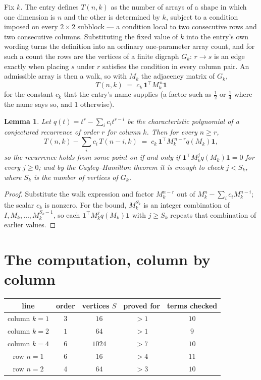 \documentclass[11pt,a4paper]{article}
\theoremstyle{plain}
\newtheorem{lemma}[theorem]{Lemma}
\theoremstyle{definition}
\begin{document}
Fix $k$. The entry defines $T(n,k)$ as the number of arrays of a shape in which one dimension
is $n$ and the other is determined by $k$, subject to a condition imposed on every
$2\times2$ subblock --- a condition local to two consecutive rows and two consecutive columns.
Substituting the fixed value of $k$ into the entry's own wording turns the definition into an
ordinary one-parameter array count, and for such a count the rows are the vertices of a finite
digraph $G_k$: $r\to s$ is an edge exactly when placing $s$ under $r$ satisfies the condition
in every column pair. An admissible array is then a walk, so with $M_k$ the adjacency matrix
of $G_k$,
\[
T(n,k)\;=\;c_k\,\mathbf{1}^{\!\top}M_k^{\,n}\mathbf{1}
\]
for the constant $c_k$ that the entry's name supplies (a factor such as $\tfrac12$ or
$\tfrac14$ where the name says so, and $1$ otherwise).

\begin{lemma}\label{lem:crit}
Let $q(t)=t^{r}-\sum_i c_it^{r-i}$ be the characteristic polynomial of a conjectured
recurrence of order $r$ for column $k$. Then for every $n\ge r$,
\[
T(n,k)-\sum_i c_i\,T(n-i,k)\;=\;c_k\,\mathbf{1}^{\!\top}M_k^{\,n-r}q(M_k)\mathbf{1},
\]
so the recurrence holds from some point on if and only if
$\mathbf{1}^{\!\top}M_k^{j}q(M_k)\mathbf{1}=0$ for every $j\ge0$; and by the
Cayley--Hamilton theorem it is enough to check $j<S_k$, where $S_k$ is the number of vertices
of $G_k$.
\end{lemma}

\begin{proof}
Substitute the walk expression and factor $M_k^{n-r}$ out of $M_k^{n}-\sum_ic_iM_k^{n-i}$;
the scalar $c_k$ is nonzero. For the bound, $M_k^{S_k}$ is an integer combination of
$I,M_k,\dots,M_k^{S_k-1}$, so each $\mathbf{1}^{\!\top}M_k^{j}q(M_k)\mathbf{1}$ with
$j\ge S_k$ repeats that combination of earlier values.
\end{proof}

\section{The computation, column by column}

\begin{center}
\begin{tabular}{ccccc}
line & order & vertices $S$ & proved for & terms checked \\ \hline
column $k$$=1$ & $3$ & $16$ & $>1$ & $10$ \\
column $k$$=2$ & $1$ & $64$ & $>1$ & $9$ \\
column $k$$=4$ & $6$ & $1024$ & $>7$ & $10$ \\
row $n$$=1$ & $6$ & $16$ & $>4$ & $11$ \\
row $n$$=2$ & $4$ & $64$ & $>3$ & $10$ \\
\end{tabular}
\end{center}
\end{document}
